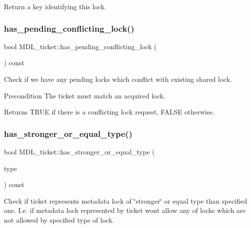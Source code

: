 Return a key identifying this lock. \mbox{\label{classMDL__ticket_a453c69eade5322291a6b3df6833892d5}} 
\subsubsection{\texorpdfstring{has\+\_\+pending\+\_\+conflicting\+\_\+lock()}{has\_pending\_conflicting\_lock()}}
{\footnotesize\ttfamily bool M\+D\+L\+\_\+ticket\+::has\+\_\+pending\+\_\+conflicting\+\_\+lock (\begin{DoxyParamCaption}{ }\end{DoxyParamCaption}) const}

Check if we have any pending locks which conflict with existing shared lock.

\begin{DoxyPrecond}{Precondition}
The ticket must match an acquired lock.
\end{DoxyPrecond}
\begin{DoxyReturn}{Returns}
T\+R\+UE if there is a conflicting lock request, F\+A\+L\+SE otherwise. 
\end{DoxyReturn}
\mbox{\label{classMDL__ticket_a3db14474f09df6e82fe7db48cc4463df}} 
\subsubsection{\texorpdfstring{has\+\_\+stronger\+\_\+or\+\_\+equal\+\_\+type()}{has\_stronger\_or\_equal\_type()}}
{\footnotesize\ttfamily bool M\+D\+L\+\_\+ticket\+::has\+\_\+stronger\+\_\+or\+\_\+equal\+\_\+type (\begin{DoxyParamCaption}\item[{enum\+\_\+mdl\+\_\+type}]{type }\end{DoxyParamCaption}) const}

Check if ticket represents metadata lock of \char`\"{}stronger\char`\"{} or equal type than specified one. I.\+e. if metadata lock represented by ticket won\textquotesingle{}t allow any of locks which are not allowed by specified type of lock.


